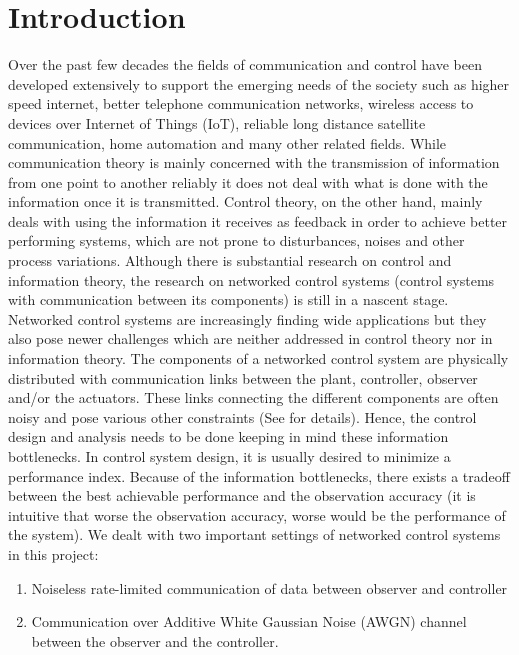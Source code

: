 \documentclass[12pt]{caltech_thesis_finalreport}
\begin{document}
\tableofcontents

\mainmatter

\chapter{Introduction}
\label{intro}
	Over the past few decades the fields of communication and control have been developed extensively to support the emerging needs of the society such as higher speed internet, better telephone communication networks, wireless access to devices over Internet of Things (IoT), reliable long distance satellite communication, home automation and many other related fields. While communication theory is mainly concerned with the transmission of information from one point to another reliably it does not deal with what is done with the information once it is transmitted. Control theory, on the other hand, mainly deals with using the information it receives as feedback in order to achieve better performing systems, which are not prone to disturbances, noises and other process variations. Although there is substantial research on control and information theory, the research on networked control systems (control systems with communication between its components) is still in a nascent stage.\\
Networked control systems are increasingly finding wide applications but they also pose newer challenges which are neither addressed in control theory nor in information theory. The components of a networked control system are physically distributed with communication links between the plant, controller, observer and/or the actuators. These links connecting the different components are often noisy and pose various other constraints (See \cite{constraints} for details). Hence, the control design and analysis needs to be done keeping in mind these information bottlenecks. In control system design, it is usually desired to minimize a performance index. Because of the information bottlenecks, there exists a tradeoff between the best achievable performance and the observation accuracy (it is intuitive that worse the observation accuracy, worse would be the performance of the system). 
We dealt with two important settings of networked control systems in this project:
\begin{enumerate}
\item Noiseless rate-limited communication of data between observer and controller 
\item Communication over Additive White Gaussian Noise (AWGN) channel between the observer and the controller.
\end{enumerate} 
\end{document}
